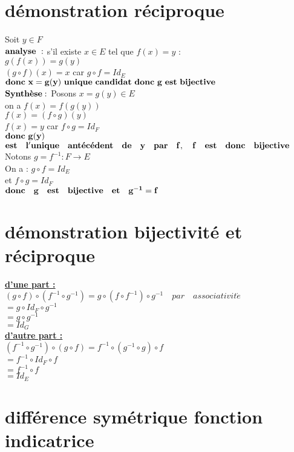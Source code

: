 \documentclass{article}
\begin{document}
	\section{d\'emonstration r\'eciproque}
	Soit $y \in F$\\
	$\bf analyse\ :$ s'il existe $x \in E$ tel que $f(x)=y$ : \\
	$g(f(x))=g(y)$\\
	$(g \circ f)(x)=x$ car $g \circ f=Id_E$\\
	$\bf donc \ x=g(y) \ unique \ candidat \ donc \ g \ est \ bijective$\\
	$\bf Synth\grave{e} se:$ Posons $x=g(y) \in E$\\
	on a $f(x)=f(g(y))$\\
	$f(x)=(f \circ g)(y)$\\
	$f(x)=y$ car $f \circ g=Id_F$\\
	$ \bf donc \ g(y)$  $\bf est \quad l'unique \quad ant\acute{e}c\acute{e}dent \quad de \quad y \quad par \quad f, \quad f \quad est \quad donc \quad bijective$\\
	Notons $g=f^{-1}:F\rightarrow E$\\
	On a : $g \circ f = Id_E$\\
	et $f \circ g = Id_F$\\
	$\bf donc \quad g \quad est \quad bijective \quad et \quad g^{-1}=f$
	\section{d\'emonstration  bijectivit\'e et r\'eciproque}
	\setlength{\parindent}{3.20cm}
	\underline{ \bf d'une part :}\\
	$(g \circ f) \circ(f^{-1}\circ g^{-1})=g\circ(f\circ f^{-1})\circ g^{-1} \quad par \quad associativit\acute{e}$\\
	\indent$= g \circ Id_F \circ g^{-1}$\\
	\indent$=g \circ g^{-1}$\\
    \indent$=Id_G$\\
    \underline{ \bf d'autre  part :}\\
    $(f^{-1} \circ g^{-1}) \circ (g \circ f)= f^{-1} \circ (g^{-1}\circ g) \circ f$\\
    \indent $= f^{-1} \circ Id_F \circ f$\\
    \indent $=f^{-1} \circ f$\\
    \indent $=Id_E$
    \section{diff\'erence sym\'etrique fonction indicatrice}
\end{document}
